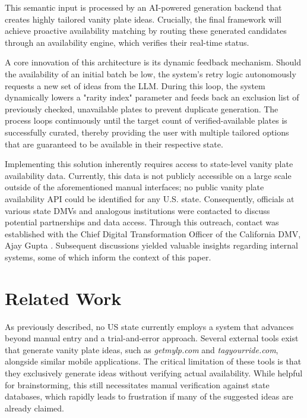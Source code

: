 \documentclass{article} %
\begin{document}
This semantic input is processed by an AI-powered generation backend that creates highly tailored vanity plate ideas. Crucially, the final framework will achieve proactive availability matching by routing these generated candidates through an availability engine, which verifies their real-time status.

A core innovation of this architecture is its dynamic feedback mechanism. Should the availability of an initial batch be low, the system's retry logic autonomously requests a new set of ideas from the LLM. During this loop, the system dynamically lowers a "rarity index" parameter and feeds back an exclusion list of previously checked, unavailable plates to prevent duplicate generation. The process loops continuously until the target count of verified-available plates is successfully curated, thereby providing the user with multiple tailored options that are guaranteed to be available in their respective state.

Implementing this solution inherently requires access to state-level vanity plate availability data. Currently, this data is not publicly accessible on a large scale outside of the aforementioned manual interfaces; no public vanity plate availability API could be identified for any U.S. state. Consequently, officials at various state DMVs and analogous institutions were contacted to discuss potential partnerships and data access. Through this outreach, contact was established with the Chief Digital Transformation Officer of the California DMV, Ajay Gupta \cite{CaliDMVLeadership}. Subsequent discussions yielded valuable insights regarding internal systems, some of which inform the context of this paper.

\section{Related Work}

As previously described, no US state currently employs a system that advances beyond manual entry and a trial-and-error approach. Several external tools exist that generate vanity plate ideas, such as \textit{getmylp.com} and \textit{tagyourride.com}, alongside similar mobile applications. The critical limitation of these tools is that they exclusively generate ideas without verifying actual availability. While helpful for brainstorming, this still necessitates manual verification against state databases, which rapidly leads to frustration if many of the suggested ideas are already claimed. 
\end{document}

